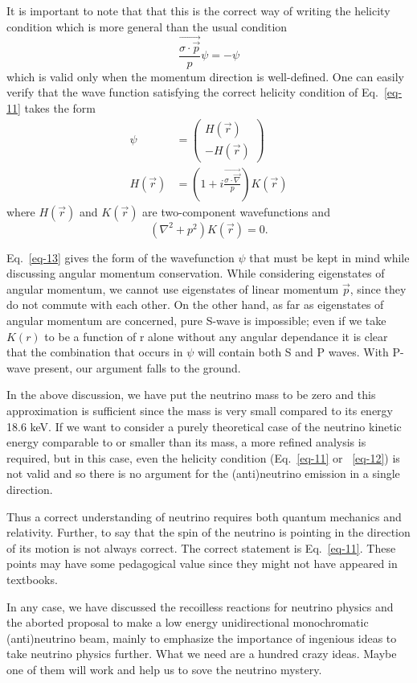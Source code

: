 It is important to note that that this is the correct way of writing the helicity condition
which is more general than the usual condition
\begin{equation}
\frac{\vec{\sigma \cdot \vec{p}}}{p}\psi = -\psi\label{eq-12}
\end{equation}
which is valid only when the momentum direction is well-defined. One can easily verify that
the wave function satisfying the correct helicity condition of Eq.~\eqref{eq-11} takes the form
\begin{align}
\psi &= \begin{pmatrix}
H(\vec{r})\\
-H(\vec{r})
\end{pmatrix}\label{eq-13}\\
H(\vec{r}) &= (1+ i\frac{\vec{\sigma \cdot \vec{\nabla}}}{p}) K (\vec{r})\label{eq-14}
\end{align}
where $H(\vec{r})$ and $K(\vec{r})$ are two-component wavefunctions and
\begin{equation}
(\nabla^{2} + p^{2}) K(\vec{r}) = 0.\label{eq-15}
\end{equation}

Eq.~\eqref{eq-13} gives the form of the wavefunction $\psi$ that must be kept in mind while discussing
angular momentum conservation. While considering eigenstates of angular momentum, we
cannot use eigenstates of linear momentum $\vec{p}$, since they do not commute with each other.
On the other hand, as far as eigenstates of angular momentum are concerned, pure S-wave is
impossible; even if we take $K(r)$ to be a function of r alone without any angular dependance
it is clear that the combination that occurs in $\psi$ will contain both S and P waves. With
P-wave present, our argument falls to the ground.

In the above discussion, we have put the neutrino mass to be zero and this approximation
is sufficient since the mass is very small compared to its energy 18.6 keV. If we want to
consider a purely theoretical case of the neutrino kinetic energy comparable to or smaller
than its mass, a more refined analysis is required, but in this case, even the helicity condition
(Eq.~\eqref{eq-11} or ~\eqref{eq-12}) is not valid and so there is no argument for the (anti)neutrino emission in
a single direction.

Thus a correct understanding of neutrino requires both quantum mechanics and relativity. Further, to say that the spin of the neutrino is pointing in the direction of its motion
is not always correct. The correct statement is Eq.~\eqref{eq-11}. These points may have some
pedagogical value since they might not have appeared in textbooks.

In any case, we have discussed the recoilless reactions for neutrino physics and the aborted
proposal to make a low energy unidirectional monochromatic (anti)neutrino beam, mainly
to emphasize the importance of ingenious ideas to take neutrino physics further. What we
need are a hundred crazy ideas. Maybe one of them will work and help us to sove the
neutrino mystery.
